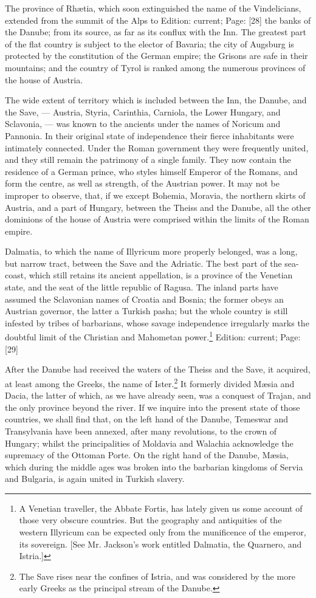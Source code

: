 The province of Rhætia, which soon extinguished the name of the Vindelicians, extended from the summit of the Alps to Edition: current; Page: [28] the banks of the Danube; from its source, as far as its conflux with the Inn. The greatest part of the flat country is subject to the elector of Bavaria; the city of Augsburg is protected by the constitution of the German empire; the Grisons are safe in their mountains; and the country of Tyrol is ranked among the numerous provinces of the house of Austria.

The wide extent of territory which is included between the Inn, the Danube, and the Save, \texthebrew{—} Austria, Styria, Carinthia, Carniola, the Lower Hungary, and Sclavonia, \texthebrew{—} was known to the ancients under the names of Noricum and Pannonia. In their original state of independence their fierce inhabitants were intimately connected. Under the Roman government they were frequently united, and they still remain the patrimony of a single family. They now contain the residence of a German prince, who styles himself Emperor of the Romans, and form the centre, as well as strength, of the Austrian power. It may not be improper to observe, that, if we except Bohemia, Moravia, the northern skirts of Austria, and a part of Hungary, between the Theiss and the Danube, all the other dominions of the house of Austria were comprised within the limits of the Roman empire.

Dalmatia, to which the name of Illyricum more properly belonged, was a long, but narrow tract, between the Save and the Adriatic. The best part of the sea-coast, which still retains its ancient appellation, is a province of the Venetian state, and the seat of the little republic of Ragusa. The inland parts have assumed the Sclavonian names of Croatia and Bosnia; the former obeys an Austrian governor, the latter a Turkish pasha; but the whole country is still infested by tribes of barbarians, whose savage independence irregularly marks the doubtful limit of the Christian and Mahometan power.\footnote{A Venetian traveller, the Abbate Fortis, has lately given us some account of those very obscure countries. But the geography and antiquities of the western Illyricum can be expected only from the munificence of the emperor, its sovereign. [See Mr. Jackson\texthebrew{}’s work entitled Dalmatia, the Quarnero, and Istria.]}
Edition: current; Page: [29]

After the Danube had received the waters of the Theiss and the Save, it acquired, at least among the Greeks, the name of Ister.\footnote{The Save rises near the confines of Istria, and was considered by the more early Greeks as the principal stream of the Danube.} It formerly divided Mæsia and Dacia, the latter of which, as we have already seen, was a conquest of Trajan, and the only province beyond the river. If we inquire into the present state of those countries, we shall find that, on the left hand of the Danube, Temeswar and Transylvania have been annexed, after many revolutions, to the crown of Hungary; whilst the principalities of Moldavia and Walachia acknowledge the supremacy of the Ottoman Porte. On the right hand of the Danube, Mæsia, which during the middle ages was broken into the barbarian kingdoms of Servia and Bulgaria, is again united in Turkish slavery.

